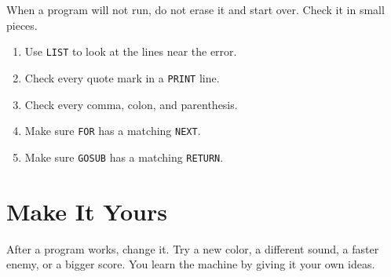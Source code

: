 When a program will not run, do not erase it and start over. Check it in small
pieces.

\begin{enumerate}
\item Use \texttt{LIST} to look at the lines near the error.
\item Check every quote mark in a \texttt{PRINT} line.
\item Check every comma, colon, and parenthesis.
\item Make sure \texttt{FOR} has a matching \texttt{NEXT}.
\item Make sure \texttt{GOSUB} has a matching \texttt{RETURN}.
\end{enumerate}

\section*{Make It Yours}
{}

After a program works, change it. Try a new color, a different sound, a faster
enemy, or a bigger score. You learn the machine by giving it your own ideas.
